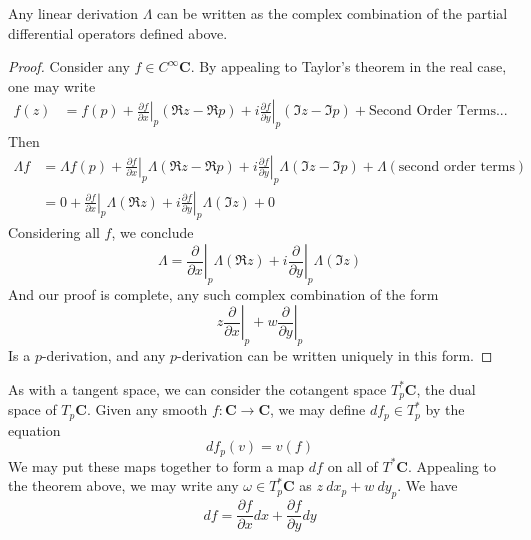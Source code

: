 \begin{theorem}
    Any linear derivation $\Lambda$ can be written as the complex combination of the partial differential operators defined above.
\end{theorem}
\begin{proof}
    Consider any $f \in C^\infty \mathbf{C}$. By appealing to Taylor's theorem in the real case, one may write
    \begin{align*} f(z) &= f(p) + \left.\frac{\partial f}{\partial x}\right|_p (\Re z - \Re p) + i \left. \frac{\partial f}{\partial y} \right|_p (\Im z - \Im p) + \text{Second Order Terms}...
    \end{align*}
    Then
    \begin{align*}
        \Lambda f &= \Lambda f(p) + \left.\frac{\partial f}{\partial x}\right|_p \Lambda(\Re z - \Re p) + i \left. \frac{\partial f}{\partial y} \right|_p \Lambda(\Im z - \Im p) + \Lambda(\text{second order terms})\\
        &= 0 + \left.\frac{\partial f}{\partial x}\right|_p \Lambda (\Re z) + i \left. \frac{\partial f}{\partial y} \right|_p \Lambda(\Im z) + 0
    \end{align*}
    Considering all $f$, we conclude
    \[ \Lambda = \left.\frac{\partial}{\partial x}\right|_p \Lambda (\Re z) + i \left. \frac{\partial}{\partial y} \right|_p \Lambda(\Im z) \]
    And our proof is complete, any such complex combination of the form
    \[ z \left.\frac{\partial}{\partial x}\right|_p + w \left. \frac{\partial}{\partial y} \right|_p \]
    Is a $p$-derivation, and any $p$-derivation can be written uniquely in this form.
\end{proof}

As with a tangent space, we can consider the cotangent space $T_p^* \mathbf{C}$, the dual space of $T_p \mathbf{C}$. Given any smooth $f: \mathbf{C} \to \mathbf{C}$, we may define $df_p \in T_p^*$ by the equation
%
\[ df_p (v) = v(f) \]
%
We may put these maps together to form a map $df$ on all of $T^* \mathbf{C}$. Appealing to the theorem above, we may write any $\omega \in T_p^* \mathbf{C}$ as $z\ dx_p + w\ dy_p$. 
%
We have
%
\[ df = \frac{\partial f}{\partial x} dx + \frac{\partial f}{\partial y} dy \]

